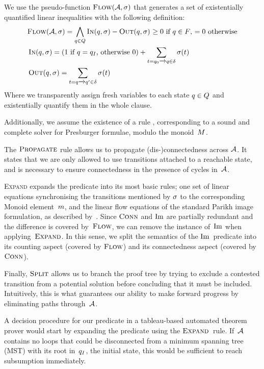 \documentclass{easychair}
\theoremstyle{definition}
\begin{document}
We use the pseudo-function $\textsc{Flow}(\mathcal{A}, \operatorname{\sigma})$ that generates a set
of existentially quantified linear inequalities with the following definition:
$$
\begin{aligned}
  & \textsc{Flow}(\mathcal{A}, \operatorname{\sigma}) = \bigwedge_{q \in Q} \operatorname{\textsc{In}}(q, \operatorname{\sigma}) - \operatorname{\textsc{Out}}(q, \operatorname{\sigma})
\text{ $\geq 0$ if $q \in F$, $= 0$ otherwise}\\
  & \operatorname{\textsc{In}}(q, \operatorname{\sigma}) = \left(\text{$1$ if $q = q_I$, otherwise $0$}\right) + \sum_{t = q_0 \xrightarrow{} q \in \delta} \operatorname{\sigma}(t)\\
  & \operatorname{\textsc{Out}}(q, \operatorname{\sigma}) = \sum_{t = q \xrightarrow{} q' \in \delta} \operatorname{\sigma}(t)
\end{aligned}
$$
Where we transparently assign fresh variables to each state $q \in Q$
and existentially quantify them in the whole clause.

Additionally, we assume the existence of a rule \PresburgerClose{},
corresponding to a sound and complete solver for Presburger formulae, modulo the
monoid~$M$.

The $\textsc{Propagate}{}$ rule allows us to propagate (dis-)connectedness across
$\mathcal{A}$. It states that we are only allowed to use transitions attached to
a reachable state, and is necessary to ensure connectedness in the presence of
cycles in~$\mathcal{A}$.

\textsc{Expand} expands the predicate into its most basic rules; one set of
linear equations synchronising the transitions mentioned by $\operatorname{\sigma}$ to the
corresponding Monoid element~$m$, and the linear flow equations of
the standard Parikh image formulation, as described by~\FlowEq. Since
$\operatorname{\textsc{Conn}}$ and $\operatorname{Im}$ are partially redundant and the difference is covered
by~$\textsc{Flow}$, we can remove the instance of~$\operatorname{Im}$ when applying~$\textsc{Expand}$. In
this sense, we split the semantics of the $\operatorname{Im}$~predicate into its counting
aspect (covered by $\textsc{Flow}$) and its connectedness aspect (covered by
$\operatorname{\textsc{Conn}}$).

Finally, $\textsc{Split}{}$ allows us to branch the proof tree by trying to exclude a
contested transition from a potential solution before concluding that it must be
included. Intuitively, this is what guarantees our ability to make forward
progress by eliminating paths through~$\mathcal{A}$.

A decision procedure for our predicate in a tableau-based automated theorem
prover would start by expanding the predicate using the $\textsc{Expand}{}$~rule.
If~$\mathcal{A}$ contains no loops that could be disconnected from a minimum
spanning tree (MST) with its root in~$q_I$, the initial state, this
would be sufficient to reach subsumption immediately.
\end{document}
